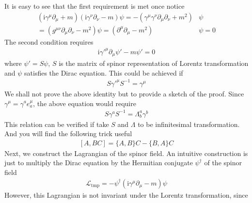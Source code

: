 \documentclass[letterpaper,10pt,english]{sphinxmanual}
\begin{document}
It is easy to see that the first requirement is met once notice
\begin{equation*}
\begin{split}(\mathrm{i}\gamma^\mu\!\partial_\mu + m)(\mathrm{i}\gamma^\nu\!\partial_\nu - m)\psi = -(\gamma^\mu\gamma^\nu\partial_\mu\partial_\nu + m^2)&\psi\\
= (g^{\mu\nu}\partial_\mu\partial_\nu - m^2)\psi = (\partial^\mu\partial_\mu - m^2)&\psi = 0\end{split}
\end{equation*}
The second condition requires
\begin{equation*}
\begin{split}\mathrm{i}\gamma'^\mu\!\partial_\mu\psi' - m\psi' = 0\end{split}
\end{equation*}
where \(\psi' = S\psi\), \(S\) is the matrix of spinor representation of Lorentz transformation and \(\psi\) satisfies the Dirac equation. This could be achieved if
\begin{equation*}
\begin{split}S\gamma'^\mu S^{-1} = \gamma^\mu\end{split}
\end{equation*}
We shall not prove the above identity but to provide a sketch of the proof. Since \(\gamma^\mu = \gamma^a e_a^\mu\), the above equation would require
\begin{equation*}
\begin{split}S\gamma^a S^{-1} = \varLambda^a_b\gamma^b\end{split}
\end{equation*}
This relation can be verified if take \(S\) and \(\varLambda\) to be infinitesimal transformation. And you will find the following trick useful
\begin{equation*}
\begin{split}[A, BC] = \{A,B\}C - \{B, A\}C\end{split}
\end{equation*}
Next, we construct the Lagrangian of the spinor field. An intuitive construction is just to multiply the Dirac equation by the Hermitian conjugate \(\psi^\dagger\) of the spinor field
\begin{equation*}
\begin{split}\mathcal{L}_{\text{tmp}} = -\psi^\dagger(\mathrm{i}\gamma^\mu\!\partial_\mu - m)\psi\end{split}
\end{equation*}
However, this Lagrangian is not invariant under the Lorentz transformation, since
\end{document}
